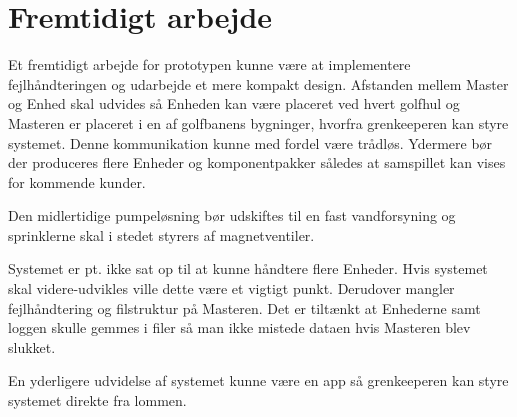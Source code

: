 \chapter{Fremtidigt arbejde}

Et fremtidigt arbejde for prototypen kunne være at implementere fejlhåndteringen og udarbejde et mere kompakt design. Afstanden mellem Master og Enhed skal udvides så Enheden kan være placeret ved hvert golfhul og Masteren er placeret i en af golfbanens bygninger, hvorfra grenkeeperen kan styre systemet. Denne kommunikation kunne med fordel være trådløs. Ydermere bør der produceres flere Enheder og komponentpakker således at samspillet kan vises for kommende kunder. 

Den midlertidige pumpeløsning bør udskiftes til en fast vandforsyning og sprinklerne skal i stedet styrers af magnetventiler. 

Systemet er pt. ikke sat op til at kunne håndtere flere Enheder. Hvis systemet skal videre-udvikles ville dette være et vigtigt punkt. Derudover mangler fejlhåndtering og filstruktur på Masteren. Det er tiltænkt at Enhederne samt loggen skulle gemmes i filer så man ikke mistede dataen hvis Masteren blev slukket.

En yderligere udvidelse af systemet kunne være en app så grenkeeperen kan styre systemet direkte fra lommen. 